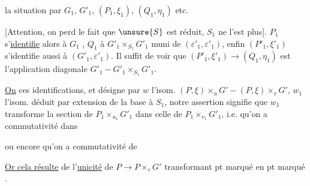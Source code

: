 la situation par $G_1$, $G'_1$, $(P_1,\xi_1)$, $(Q_1,\eta_1)$ etc.

[Attention, on perd le fait que $\unsure{S}$ est réduit, $S_1$ ne l'est plus].
$P_1$ s'\uline{identifie} alors à $G_1$
,
$Q_1$ à $G'_1\times_{S_1}G'_1$ muni de $(\varepsilon'_1,\varepsilon'_1)$,
 enfin $(P'_1,\xi'_1)$ s'identifie aussi à
$(G'_1,\varepsilon'_1)$.
Il suffit de voir que $(P'_1,\xi'_1)\to(Q_1,\eta_1)$ est
l'application diagonale $G'_1-G'_1\times_{S_1}G'_1$.

\uline{On}  ces identifications, et désigne par $w$ l'isom.
$(P,\xi)\times_u G'-(P,\xi)\times_v G'$,
$w_1$ l'isom. déduit par extension de la base à $S_1$,
notre assertion signifie que $w_1$ transforme la section
 de $P_1\times_{u_1}G'_1$ dans celle de
$P_1\times_{v_1}G'_1$, i.e. qu'on a commutativité dans


ou encore qu'on a commutativité de


\uline{Or cela résulte} de l'\uline{unicité} de $P\to P\times_vG'$
transformant  pt marqué en pt marqué .
